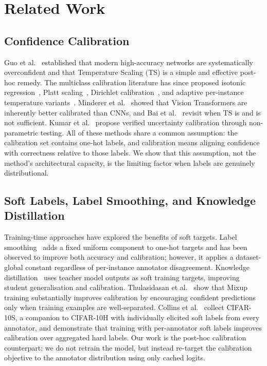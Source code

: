 \documentclass[10pt,journal,compsoc]{IEEEtran}
\begin{document}
\section{Related Work}
\label{sec:related}

\subsection{Confidence Calibration}
Guo et al.~\cite{guo2017calibration} established that modern high-accuracy networks are systematically overconfident and that Temperature Scaling (TS) is a simple and effective post-hoc remedy.  The multiclass calibration literature has since proposed isotonic regression~\cite{zadrozny2002transforming}, Platt scaling~\cite{platt1999probabilistic}, Dirichlet calibration~\cite{kull2019beyond}, and adaptive per-instance temperature variants~\cite{joy2023sample}.  Minderer et al.~\cite{minderer2021revisiting} showed that Vision Transformers are inherently better calibrated than CNNs, and Bai et al.~\cite{bai2021don} revisit when TS is and is not sufficient.  Kumar et al.~\cite{kumar2019verified} propose verified uncertainty calibration through non-parametric testing.  All of these methods share a common assumption: the calibration set contains one-hot labels, and calibration means aligning confidence with correctness relative to those labels.  We show that this assumption, not the method's architectural capacity, is the limiting factor when labels are genuinely distributional.

\subsection{Soft Labels, Label Smoothing, and Knowledge Distillation}
Training-time approaches have explored the benefits of soft targets.  Label smoothing~\cite{szegedy2016rethinking,muller2019does} adds a fixed uniform component to one-hot targets and has been observed to improve both accuracy and calibration; however, it applies a dataset-global constant regardless of per-instance annotator disagreement.  Knowledge distillation~\cite{hinton2015distilling} uses teacher model outputs as soft training targets, improving student generalisation and calibration.  Thulasidasan et al.~\cite{thulasidasan2019mixup} show that Mixup training substantially improves calibration by encouraging confident predictions only when training examples are well-separated.  Collins et al.~\cite{collins2022eliciting} collect CIFAR-10S, a companion to CIFAR-10H with individually elicited soft labels from every annotator, and demonstrate that training with per-annotator soft labels improves calibration over aggregated hard labels.  Our work is the post-hoc calibration counterpart: we do not retrain the model, but instead re-target the calibration objective to the annotator distribution using only cached logits.
\end{document}
